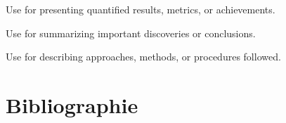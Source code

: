 \documentclass{internshipreport}
\begin{document}
\begin{results}
Use for presenting quantified results, metrics, or achievements.
\end{results}

\begin{keyfindings}
Use for summarizing important discoveries or conclusions.
\end{keyfindings}

\begin{methodology}
Use for describing approaches, methods, or procedures followed.
\end{methodology}

\chapter*{Bibliographie}
\nocite{*}
\printbibliography[heading=none]
\end{document}
